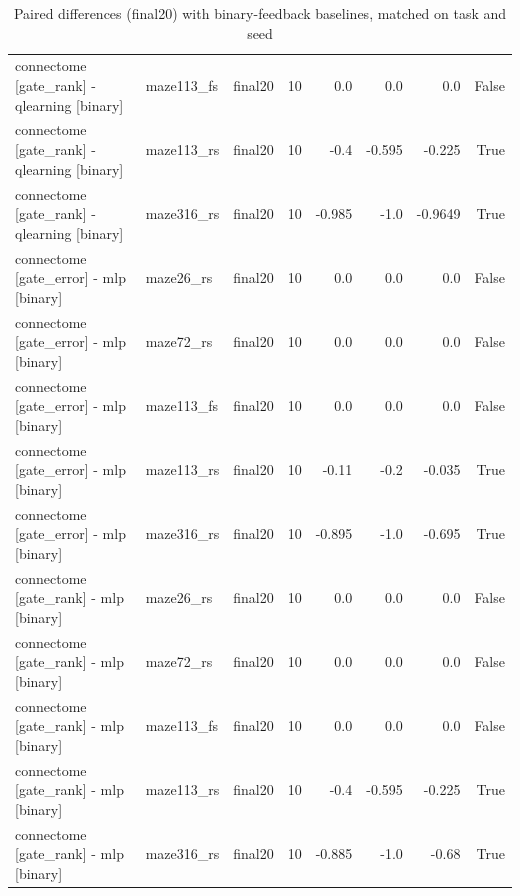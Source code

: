 \begin{table}[t]
\begin{tabular}{lllrrrrr}
connectome [gate\_rank] - qlearning [binary] & maze113\_fs & final20 & 10 & 0.0 & 0.0 & 0.0 & False \\
connectome [gate\_rank] - qlearning [binary] & maze113\_rs & final20 & 10 & -0.4 & -0.595 & -0.225 & True \\
connectome [gate\_rank] - qlearning [binary] & maze316\_rs & final20 & 10 & -0.985 & -1.0 & -0.9649 & True \\
connectome [gate\_error] - mlp [binary] & maze26\_rs & final20 & 10 & 0.0 & 0.0 & 0.0 & False \\
connectome [gate\_error] - mlp [binary] & maze72\_rs & final20 & 10 & 0.0 & 0.0 & 0.0 & False \\
connectome [gate\_error] - mlp [binary] & maze113\_fs & final20 & 10 & 0.0 & 0.0 & 0.0 & False \\
connectome [gate\_error] - mlp [binary] & maze113\_rs & final20 & 10 & -0.11 & -0.2 & -0.035 & True \\
connectome [gate\_error] - mlp [binary] & maze316\_rs & final20 & 10 & -0.895 & -1.0 & -0.695 & True \\
connectome [gate\_rank] - mlp [binary] & maze26\_rs & final20 & 10 & 0.0 & 0.0 & 0.0 & False \\
connectome [gate\_rank] - mlp [binary] & maze72\_rs & final20 & 10 & 0.0 & 0.0 & 0.0 & False \\
connectome [gate\_rank] - mlp [binary] & maze113\_fs & final20 & 10 & 0.0 & 0.0 & 0.0 & False \\
connectome [gate\_rank] - mlp [binary] & maze113\_rs & final20 & 10 & -0.4 & -0.595 & -0.225 & True \\
connectome [gate\_rank] - mlp [binary] & maze316\_rs & final20 & 10 & -0.885 & -1.0 & -0.68 & True \\
\bottomrule
\end{tabular}
\caption{Paired differences (final20) with binary-feedback baselines, matched on task and seed}
\label{tab:gridworld_binary_paired_final20}
\end{table}